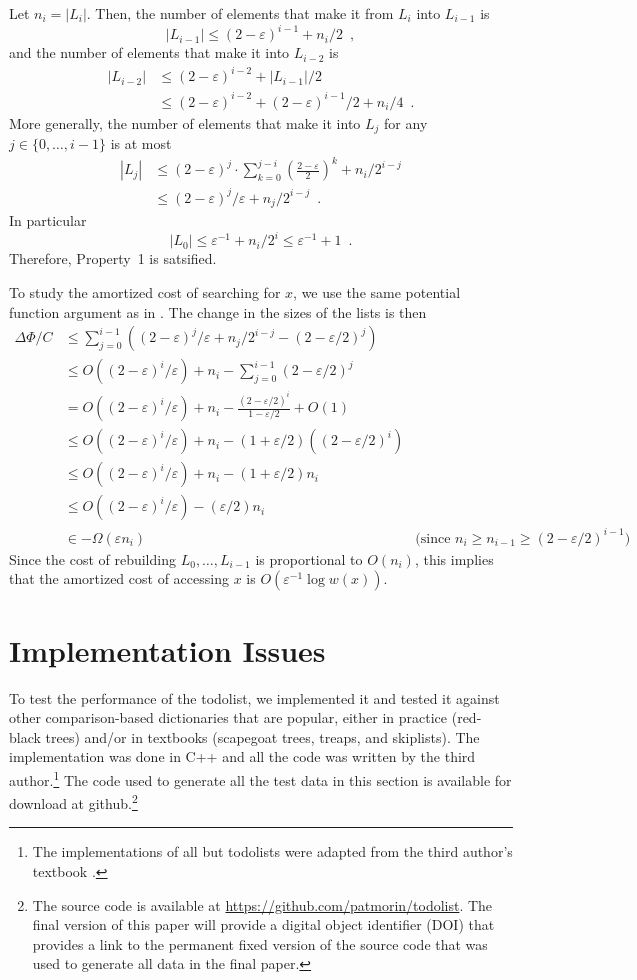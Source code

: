 \documentclass[lotsofwhite]{patmorin}
\newcommand{\eps}{\varepsilon}
\begin{document}
Let $n_i=|L_i|$. Then,
the number of elements that make it from $L_i$ into $L_{i-1}$ is 
\[  |L_{i-1}| \le (2-\eps)^{i-1} + n_i/2 \enspace , \]
and the number of elements that make it into $L_{i-2}$ is
\begin{align*}
   |L_{i-2}| & \le (2-\eps)^{i-2} + |L_{i-1}|/2 \\
     & \le (2-\eps)^{i-2} + (2-\eps)^{i-1}/2 + n_i/4 \enspace . 
\end{align*}
More generally, the number of elements that make it into $L_j$ for any $j\in \{0,\ldots,i-1\}$ is at most
\begin{align*}
    |L_j| & \le (2-\eps)^{j} \cdot \sum_{k=0}^{j-i}\left(\frac{2-\eps}{2}\right)^k  + n_i/2^{i-j} \\
       & \le (2-\eps)^j/\eps + n_j/2^{i-j} \enspace .
\end{align*}
In particular
\[
    |L_0| \le \eps^{-1} + n_i/2^i \le \eps^{-1} + 1\enspace .
\]
Therefore, Property~1 is satsified.

To study the amortized cost of searching for $x$, we use the same
potential function argument as in .  The change in the sizes of the lists is then 
\begin{align*}
  \Delta\Phi/C & \le \sum_{j=0}^{i-1}\left((2-\eps)^j/\eps + n_j/2^{i-j} - (2-\eps/2)^j\right) \\
  & \le O((2-\eps)^i/\eps) + n_i - \sum_{j=0}^{i-1}(2-\eps/2)^j \\
  & = O((2-\eps)^i/\eps) + n_i - \frac{(2-\eps/2)^i}{1-\eps/2} + O(1) \\
  & \le O((2-\eps)^i/\eps) + n_i - (1+\eps/2)((2-\eps/2)^i) \\
  & \le O((2-\eps)^i/\eps) + n_i - (1+\eps/2)n_i \\
  & \le O((2-\eps)^i/\eps) - (\eps/2)n_i \\
  & \in - \Omega(\eps n_i) & \text{(since $n_i \ge n_{i-1} \ge (2-\eps/2)^{i-1}$)}
\end{align*}
Since the cost of rebuilding $L_0,\ldots,L_{i-1}$ is proportional to $O(n_i)$, this implies that the amortized cost of accessing $x$ is $O(\eps^{-1}\log w(x))$.


\section{Implementation Issues}

To test the performance of the todolist, we implemented it and tested
it against other comparison-based dictionaries that are popular, either
in practice (red-black trees) and/or in textbooks (scapegoat trees,
treaps, and skiplists).  The implementation was done in C++ and all
the code was written by the third author.\footnote{The implementations of all
but todolists were adapted from the third author's textbook \cite{morin:open}.}
The code used to generate all the test data in this section is available
for download at github.\footnote{The source code is available at \url{https://github.com/patmorin/todolist}. The final version of this paper
will provide a digital object identifier (DOI) that provides a link to
the permanent fixed version of the source code that was used to generate
all data in the final paper.}
\end{document}
